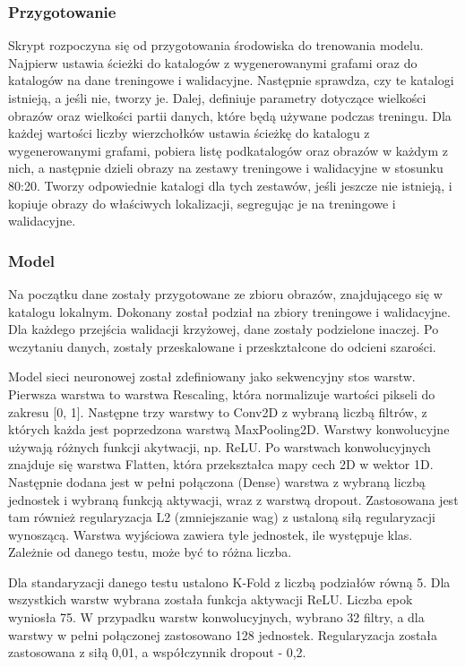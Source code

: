 \subsubsection{Przygotowanie}
Skrypt rozpoczyna się od przygotowania środowiska do trenowania modelu.
Najpierw ustawia ścieżki do katalogów z wygenerowanymi grafami oraz do katalogów na dane treningowe i walidacyjne.
Następnie sprawdza, czy te katalogi istnieją, a jeśli nie, tworzy je.
Dalej, definiuje parametry dotyczące wielkości obrazów oraz wielkości partii danych, które będą używane podczas treningu.
Dla każdej wartości liczby wierzchołków ustawia ścieżkę do katalogu z wygenerowanymi grafami,
pobiera listę podkatalogów oraz obrazów w każdym z nich,
a następnie dzieli obrazy na zestawy treningowe i walidacyjne w stosunku 80:20.
Tworzy odpowiednie katalogi dla tych zestawów, jeśli jeszcze nie istnieją,
i kopiuje obrazy do właściwych lokalizacji, segregując je na treningowe i walidacyjne.

\subsubsection{Model}
Na początku dane zostały przygotowane ze zbioru obrazów, znajdującego się w katalogu lokalnym.
Dokonany został podział na zbiory treningowe i walidacyjne.
Dla każdego przejścia walidacji krzyżowej, dane zostały podzielone inaczej.
Po wczytaniu danych, zostały przeskalowane i przeskztałcone do odcieni szarości.

Model sieci neuronowej został zdefiniowany jako sekwencyjny stos warstw.
Pierwsza warstwa to warstwa Rescaling, która normalizuje wartości pikseli do zakresu [0, 1].
Następne trzy warstwy to Conv2D z wybraną liczbą filtrów, z których każda jest poprzedzona warstwą MaxPooling2D.
Warstwy konwolucyjne używają różnych funkcji akytwacji, np. ReLU.
Po warstwach konwolucyjnych znajduje się warstwa Flatten, która przekształca mapy cech 2D w wektor 1D.
Następnie dodana jest w pełni połączona (Dense) warstwa z wybraną liczbą jednostek
i wybraną funkcją aktywacji, wraz z warstwą dropout.
Zastosowana jest tam również regularyzacja L2 (zmniejszanie wag) z ustaloną siłą regularyzacji wynoszącą.
Warstwa wyjściowa zawiera tyle jednostek, ile występuje klas.
Zależnie od danego testu, może być to różna liczba.

Dla standaryzacji danego testu ustalono K-Fold z liczbą podziałów równą 5.
Dla wszystkich warstw wybrana została funkcja aktywacji ReLU.
Liczba epok wyniosła 75.
W przypadku warstw konwolucyjnych, wybrano 32 filtry, a dla warstwy w pełni połączonej zastosowano 128 jednostek.
Regularyzacja została zastosowana z siłą 0,01, a współczynnik dropout - 0,2.


